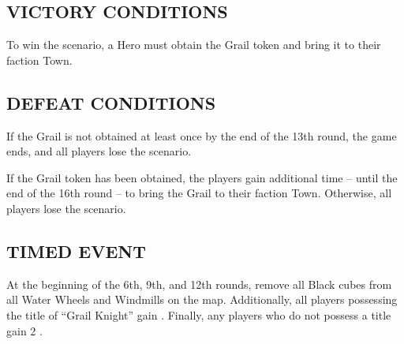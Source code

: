 \begin{multicols*}{2}
\subsection*{\MakeUppercase{Victory Conditions}}
To win the scenario, a Hero must obtain the Grail token and bring it to their faction Town.

\subsection*{\MakeUppercase{Defeat Conditions}}
If the Grail is not obtained at least once by the end of the 13th round, the game ends, and all players lose the scenario.

If the Grail token has been obtained, the players gain additional time – until the end of the 16th round – to bring the Grail to their faction Town. Otherwise, all players lose the scenario.

\subsection*{\MakeUppercase{Timed Event}}
At the beginning of the 6th, 9th, and 12th rounds, remove all Black cubes from all Water Wheels and Windmills on the map. Additionally, all players possessing the title of ``\textcolor{darkcerulean}{Grail Knight}'' gain . Finally, any players who do not possess a title gain 2 .
\end{multicols*}

